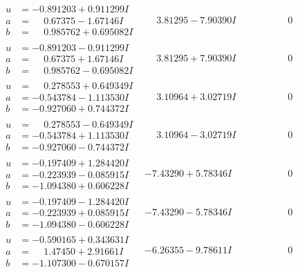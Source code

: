 \documentclass[1p]{elsarticle_modified}
\theoremstyle{definition}
\begin{document}
$$\begin{array}{c|c|c}
\begin{aligned}
u &= -0.891203 + 0.911299 I \\
a &= \phantom{-}0.67375 - 1.67146 I \\
b &= \phantom{-}0.985762 + 0.695082 I\end{aligned}
 & \phantom{-}3.81295 - 7.90390 I & \phantom{-0.000000 } 0 \\ \hline\begin{aligned}
u &= -0.891203 - 0.911299 I \\
a &= \phantom{-}0.67375 + 1.67146 I \\
b &= \phantom{-}0.985762 - 0.695082 I\end{aligned}
 & \phantom{-}3.81295 + 7.90390 I & \phantom{-0.000000 } 0 \\ \hline\begin{aligned}
u &= \phantom{-}0.278553 + 0.649349 I \\
a &= -0.543784 - 1.113530 I \\
b &= -0.927060 + 0.744372 I\end{aligned}
 & \phantom{-}3.10964 + 3.02719 I & \phantom{-0.000000 } 0 \\ \hline\begin{aligned}
u &= \phantom{-}0.278553 - 0.649349 I \\
a &= -0.543784 + 1.113530 I \\
b &= -0.927060 - 0.744372 I\end{aligned}
 & \phantom{-}3.10964 - 3.02719 I & \phantom{-0.000000 } 0 \\ \hline\begin{aligned}
u &= -0.197409 + 1.284420 I \\
a &= -0.223939 - 0.085915 I \\
b &= -1.094380 + 0.606228 I\end{aligned}
 & -7.43290 + 5.78346 I & \phantom{-0.000000 } 0 \\ \hline\begin{aligned}
u &= -0.197409 - 1.284420 I \\
a &= -0.223939 + 0.085915 I \\
b &= -1.094380 - 0.606228 I\end{aligned}
 & -7.43290 - 5.78346 I & \phantom{-0.000000 } 0 \\ \hline\begin{aligned}
u &= -0.590165 + 0.343631 I \\
a &= \phantom{-}1.47450 + 2.91661 I \\
b &= -1.107300 - 0.670157 I\end{aligned}
 & -6.26355 - 9.78611 I & \phantom{-0.000000 } 0 \\ \hline\begin{aligned}

\end{aligned}
\end{array}$$
\end{document}
